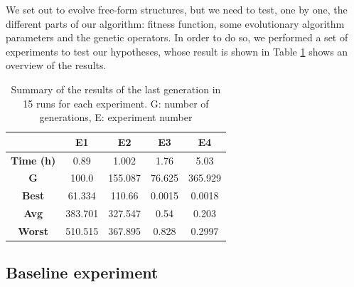 \documentclass[runningheads,a4paper]{llncs}
\newcommand{\myfloatalign}{\centering} %
\begin{document}
We set out to evolve free-form structures, but we need to test, one by
one, the different parts of our algorithm: fitness function, some
evolutionary algorithm parameters and the genetic operators. In order
to do so, we performed a set of experiments to test our hypotheses,
whose result is shown in Table \ref{t:resOver} shows an overview of the results. 
\begin{table}[H]
	\myfloatalign
	\begin{tabular}{ccccc}
		& \textbf{E1} & \textbf{E2} & \textbf{E3} &\textbf{E4} \\ \hline
		\textbf{Time (h)} & 0.89 & 1.002 & 1.76 & 5.03 \\  \hline
		\textbf{G} &  100.0 & 155.087 & 76.625 & 365.929 \\  \hline
		\textbf{Best} & 61.334 & 110.66 & 0.0015 & 0.0018 \\  \hline
		\textbf{Avg} & 383.701 & 327.547 & 0.54 &  0.203 \\  \hline
		\textbf{Worst}  & 510.515 & 367.895 & 0.828 & 0.2997\\  \hline
		\hline
	\end{tabular}
	\caption{Summary of the results of the last generation in 15 runs for each
          experiment.
          G: number of generations, E: experiment 
	number} %
	\label{t:resOver}
\end{table}

\subsection{Baseline experiment}
\end{document}
